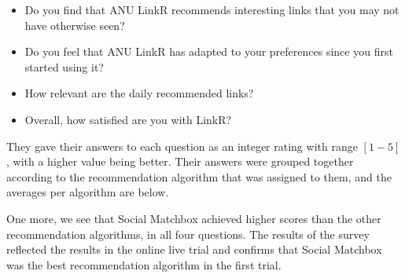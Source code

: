 \begin{itemize}
\item{Do you find that ANU LinkR recommends interesting links that you may not have otherwise seen?}
\item{Do you feel that ANU LinkR has adapted to your preferences since you first started using it?}
\item{How relevant are the daily recommended links?}
\item{Overall, how satisfied are you with LinkR?}
\end{itemize}

They gave their answers to each question as an integer rating with range $[1-5]$, with a higher value being better. Their answers were grouped together according to the recommendation algorithm that was assigned to them, and the averages per algorithm are below.

One more, we see that Social Matchbox achieved higher scores than the other recommendation algorithms, in all four questions. The results of the survey reflected the results in the online live trial and confirms that Social Matchbox was the best recommendation algorithm in the first trial.
 
